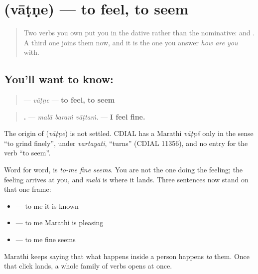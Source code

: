\section[\texorpdfstring{\mr{वाटणे} (vāṭṇe)}{वाटणे (vāṭṇe)}]{ (vāṭṇe) — to feel, to seem}

\label{lesson:MR-C23-vatne}



\begin{quote}
Two verbs you own put you in the dative rather than the nominative: \textbf{  } and \textbf{  }. A third one joins them now, and it is the one you answer \emph{how are you} with.
\end{quote}

\subsection*{You'll want to know: }
\begin{quote}
\textbf{} — \emph{vāṭṇe} — \textbf{to feel, to seem}
\end{quote}

\begin{quote}
\textbf{  .} — \emph{malā baraṁ vāṭtaṁ.} — \textbf{I feel fine.}
\end{quote}

\begin{cousinweb}
The origin of \textbf{} (\emph{vāṭṇe}) is not settled. CDIAL has a Marathi \emph{vāṭṇẽ} only in the sense \textquotedblleft{}to grind finely\textquotedblright{}, under \emph{vartayati}, \textquotedblleft{}turns\textquotedblright{} (CDIAL 11356), and no entry for the verb \textquotedblleft{}to seem\textquotedblright{}.
\end{cousinweb}

\begin{grammarlens}[title={Grammar Lens: the third verb that puts you in the dative}]
Word for word, \textbf{  } is \emph{to-me fine seems}. You are not the one doing the feeling; the feeling arrives at you, and \textbf{} \emph{malā} is where it lands. Three sentences now stand on that one frame:

\begin{itemize}
\raggedright
  \item \textbf{  } — to me it is known
  \item \textbf{  } — to me Marathi is pleasing
  \item \textbf{  } — to me fine seems
\end{itemize}

Marathi keeps saying that what happens inside a person happens \emph{to} them. Once that click lands, a whole family of verbs opens at once.
\end{grammarlens}

